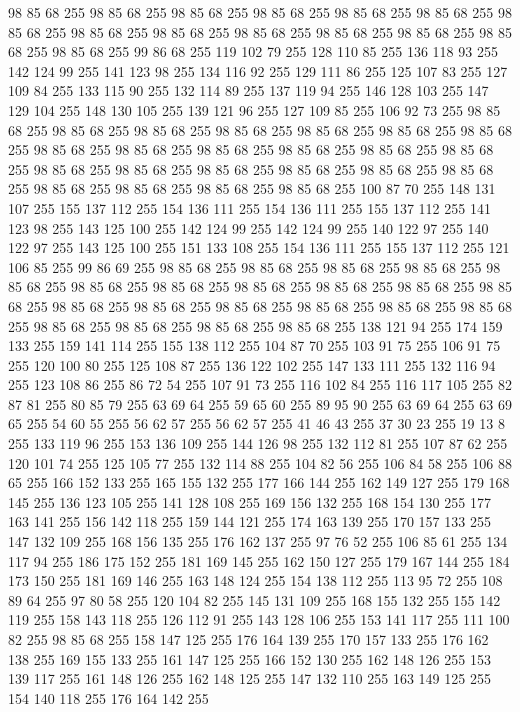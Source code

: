 98 85 68 255 98 85 68 255 98 85 68 255 98 85 68 255 98 85 68 255 98 85 68 255 98 85 68 255 98 85 68 255 98 85 68 255 98 85 68 255 98 85 68 255 98 85 68 255 98 85 68 255 98 85 68 255 99 86 68 255 119 102 79 255 128 110 85 255 136 118 93 255 142 124 99 255 141 123 98 255 134 116 92 255 129 111 86 255 125 107 83 255 127 109 84 255 133 115 90 255 132 114 89 255 137 119 94 255 146 128 103 255 147 129 104 255 148 130 105 255 139 121 96 255 127 109 85 255 106 92 73 255 98 85 68 255 98 85 68 255 98 85 68 255 98 85 68 255 98 85 68 255 98 85 68 255 98 85 68 255 98 85 68 255 98 85 68 255 98 85 68 255 98 85 68 255 98 85 68 255 98 85 68 255 98 85 68 255 98 85 68 255 98 85 68 255 98 85 68 255 98 85 68 255 98 85 68 255 98 85 68 255 98 85 68 255 98 85 68 255 98 85 68 255 100 87 70 255 148 131 107 255 155 137 112 255 154 136 111 255 154 136 111 255 155 137 112 255 141 123 98 255 143 125 100 255
142 124 99 255 142 124 99 255 140 122 97 255 140 122 97 255 143 125 100 255 151 133 108 255 154 136 111 255 155 137 112 255 121 106 85 255 99 86 69 255 98 85 68 255 98 85 68 255 98 85 68 255 98 85 68 255 98 85 68 255 98 85 68 255 98 85 68 255 98 85 68 255 98 85 68 255 98 85 68 255 98 85 68 255 98 85 68 255 98 85 68 255 98 85 68 255 98 85 68 255 98 85 68 255 98 85 68 255 98 85 68 255 98 85 68 255 98 85 68 255 98 85 68 255 138 121 94 255 174 159 133 255 159 141 114 255 155 138 112 255 104 87 70 255 103 91 75 255 106 91 75 255 120 100 80 255 125 108 87 255 136 122 102 255 147 133 111 255 132 116 94 255 123 108 86 255 86 72 54 255 107 91 73 255 116 102 84 255 116 117 105 255 82 87 81 255 80 85 79 255 63 69 64 255 59 65 60 255 89 95 90 255 63 69 64 255 63 69 65 255 54 60 55 255 56 62 57 255 56 62 57 255 41 46 43 255 37 30 23 255 19 13 8 255 133 119 96 255 153 136 109 255 144 126 98 255
132 112 81 255 107 87 62 255 120 101 74 255 125 105 77 255 132 114 88 255 104 82 56 255 106 84 58 255 106 88 65 255 166 152 133 255 165 155 132 255 177 166 144 255 162 149 127 255 179 168 145 255 136 123 105 255 141 128 108 255 169 156 132 255 168 154 130 255 177 163 141 255 156 142 118 255 159 144 121 255 174 163 139 255 170 157 133 255 147 132 109 255 168 156 135 255 176 162 137 255 97 76 52 255 106 85 61 255 134 117 94 255 186 175 152 255 181 169 145 255 162 150 127 255 179 167 144 255 184 173 150 255 181 169 146 255 163 148 124 255 154 138 112 255 113 95 72 255 108 89 64 255 97 80 58 255 120 104 82 255 145 131 109 255 168 155 132 255 155 142 119 255 158 143 118 255 126 112 91 255 143 128 106 255 153 141 117 255 111 100 82 255 98 85 68 255 158 147 125 255 176 164 139 255 170 157 133 255 176 162 138 255 169 155 133 255 161 147 125 255 166 152 130 255 162 148 126 255 153 139 117 255 161 148 126 255 162 148 125 255 147 132 110 255 163 149 125 255 154 140 118 255 176 164 142 255
